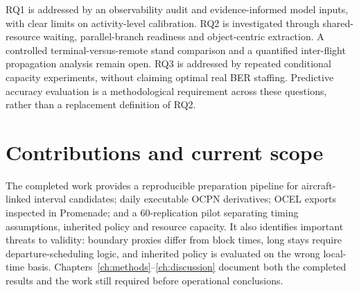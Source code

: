 RQ1 is addressed by an observability audit and evidence-informed model inputs, with clear limits on activity-level calibration. RQ2 is investigated through shared-resource waiting, parallel-branch readiness and object-centric extraction. A controlled terminal-versus-remote stand comparison and a quantified inter-flight propagation analysis remain open. RQ3 is addressed by repeated conditional capacity experiments, without claiming optimal real BER staffing. Predictive accuracy evaluation is a methodological requirement across these questions, rather than a replacement definition of RQ2.

\section{Contributions and current scope}
The completed work provides a reproducible preparation pipeline for aircraft-linked interval candidates; daily executable OCPN derivatives; OCEL exports inspected in Promenade; and a 60-replication pilot separating timing assumptions, inherited policy and resource capacity. It also identifies important threats to validity: boundary proxies differ from block times, long stays require departure-scheduling logic, and inherited policy is evaluated on the wrong local-time basis. Chapters~\ref{ch:methods}--\ref{ch:discussion} document both the completed results and the work still required before operational conclusions.
